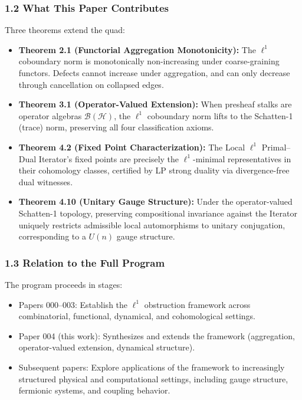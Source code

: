 \documentclass[
]{article}
\begin{document}
\subsubsection{1.2 What This Paper
Contributes}\label{what-this-paper-contributes}

Three theorems extend the quad:

\begin{itemize}
\item
  \textbf{Theorem 2.1 (Functorial Aggregation Monotonicity):} The
  \(\ell^1\) coboundary norm is monotonically non-increasing under
  coarse-graining functors. Defects cannot increase under aggregation,
  and can only decrease through cancellation on collapsed edges.
\item
  \textbf{Theorem 3.1 (Operator-Valued Extension):} When presheaf stalks
  are operator algebras \(\mathcal{B}(\mathcal{H})\), the \(\ell^1\)
  coboundary norm lifts to the Schatten-1 (trace) norm, preserving all
  four classification axioms.
\item
  \textbf{Theorem 4.2 (Fixed Point Characterization):} The Local
  \(\ell^1\) Primal--Dual Iterator's fixed points are precisely the
  \(\ell^1\)-minimal representatives in their cohomology classes,
  certified by LP strong duality via divergence-free dual witnesses.
\item
  \textbf{Theorem 4.10 (Unitary Gauge Structure):} Under the
  operator-valued Schatten-1 topology, preserving compositional
  invariance against the Iterator uniquely restricts admissible local
  automorphisms to unitary conjugation, corresponding to a \(U(n)\)
  gauge structure.
\end{itemize}

\subsubsection{1.3 Relation to the Full
Program}\label{relation-to-the-full-program}

The program proceeds in stages:

\begin{itemize}
\item
  Papers 000--003: Establish the \(\ell^1\) obstruction framework across
  combinatorial, functional, dynamical, and cohomological settings.
\item
  Paper 004 (this work): Synthesizes and extends the framework
  (aggregation, operator-valued extension, dynamical structure).
\item
  Subsequent papers: Explore applications of the framework to
  increasingly structured physical and computational settings, including
  gauge structure, fermionic systems, and coupling behavior.
\end{itemize}
\end{document}
